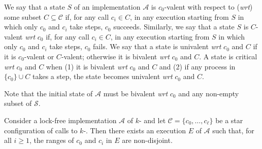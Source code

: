 We say that a state $S$ of an implementation $\mathcal{A}$ is $c_0$-valent with respect to (\textit{wrt}) some subset $C \subseteq \mathcal{C}$ if, for any call $c_i\in C$, in any execution starting from $S$ in which only $c_0$ and $c_i$ take steps, $c_0$ succeeds. Similarly, we say that a state $S$ is $C$-valent \textit{wrt} $c_0$ if, for any call $c_i\in C$, in any execution starting from $S$ in which only $c_0$ and $c_i$ take steps, $c_0$ fails. We say that a state is univalent \textit{wrt} $c_0$ and $C$ if it is $c_0$-valent or $C$-valent; otherwise it is bivalent \textit{wrt} $c_0$ and $C$. A state is critical \textit{wrt} $c_0$ and $C$ when (1) it is bivalent \textit{wrt} $c_0$ and $C$ and (2) if any process in $\lbrace c_0 \rbrace \cup C$ takes a step, the state becomes univalent \textit{wrt} $c_0$ and $C$.

Note that the initial state of $\mathcal{A}$ must be bivalent \textit{wrt} $c_0$ and any non-empty subset of $\mathcal{S}$.

\begin{lemma}\label{lemma-disjoint}
Consider a lock-free implementation $\mathcal{A}$ of $k$-\cas{} and let $\mathcal{C} = \lbrace c_0, \dots ,c_\ell \rbrace$ be a star configuration of calls to $k$-\cas{}. Then there exists an execution $E$ of $\mathcal{A}$ such that, for all $i \geq 1$, the ranges of $c_0$ and $c_i$ in $E$ are non-disjoint.
\end{lemma}

